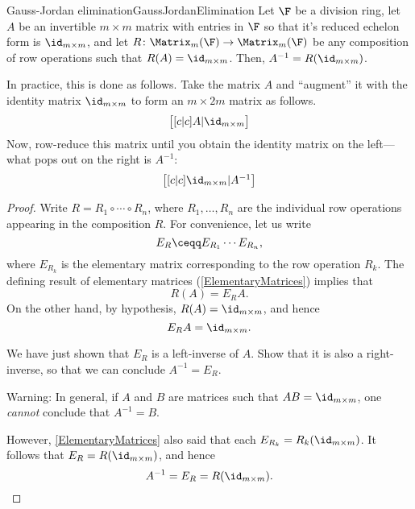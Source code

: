 \begin{thm}{Gauss-Jordan elimination}{GaussJordanElimination}
	Let $\F$ be a division ring, let $A$ be an invertible $m\times m$ matrix with entries in $\F$ so that it's reduced echelon form is $\id _{m\times m}$, and let $R\colon \Matrix _m(\F )\rightarrow \Matrix _m(\F )$ be any composition of row operations such that $R(A)=\id _{m\times m}$.  Then, $A^{-1}=R(\id _{m\times m})$.
	\begin{rmk}
		In practice, this is done as follows.  Take the matrix $A$ and ``augment'' it with the identity matrix $\id _{m\times m}$ to form an $m\times 2m$ matrix as follows.
		\begin{equation}
			\begin{bmatrix}[c | c]
				A | \id _{m\times m}
			\end{bmatrix}
		\end{equation}
		Now, row-reduce this matrix until you obtain the identity matrix on the left---what pops out on the right is $A^{-1}$:
		\begin{equation}
			\begin{bmatrix}[c | c]
				\id _{m\times m} | A^{-1}
			\end{bmatrix}
		\end{equation}
	\end{rmk}
	\begin{proof}
		Write $R=R_1\circ \cdots \circ R_n$, where $R_1,\ldots ,R_n$ are the individual row operations appearing in the composition $R$.  For convenience, let us write
		\begin{equation}
			E_R\ceqq E_{R_1}\cdots E_{R_n},
		\end{equation}
		where $E_{R_k}$ is the elementary matrix corresponding to the row operation $R_k$.  The defining result of elementary matrices (\cref{ElementaryMatrices}) implies that
		\begin{equation}
			R(A)=E_RA.
		\end{equation}
		On the other hand, by hypothesis, $R(A)=\id _{m\times m}$, and hence
		\begin{equation}
			E_RA=\id _{m\times m}.
		\end{equation}
		\begin{exr}[breakable=false]{}
			We have just shown that $E_R$ is a left-inverse of $A$.  Show that it is also a right-inverse, so that we can conclude $A^{-1}=E_R$.
			\begin{rmk}
				Warning:  In general, if $A$ and $B$ are matrices such that $AB=\id _{m\times m}$, one \emph{cannot} conclude that $A^{-1}=B$.
			\end{rmk}
		\end{exr}
		However, \cref{ElementaryMatrices} also said that each $E_{R_k}=R_k(\id _{m\times m})$.  It follows that $E_R=R(\id _{m\times m})$, and hence
		\begin{equation}
			A^{-1}=E_R=R(\id _{m\times m}).
		\end{equation}
	\end{proof}
\end{thm}
